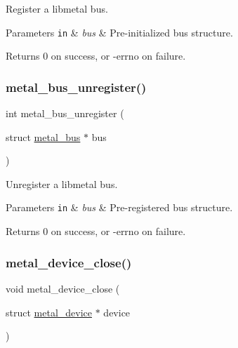Register a libmetal bus. 


\begin{DoxyParams}[1]{Parameters}
\mbox{\tt in}  & {\em bus} & Pre-\/initialized bus structure. \\
\hline
\end{DoxyParams}
\begin{DoxyReturn}{Returns}
0 on success, or -\/errno on failure. 
\end{DoxyReturn}
\mbox{\label{group__device_gafcc93056fa5993c770561e0e4865e623}} 
\subsubsection{\texorpdfstring{metal\+\_\+bus\+\_\+unregister()}{metal\_bus\_unregister()}}
{\footnotesize\ttfamily int metal\+\_\+bus\+\_\+unregister (\begin{DoxyParamCaption}\item[{struct \hyperlink{structmetal__bus}{metal\+\_\+bus} $\ast$}]{bus }\end{DoxyParamCaption})}



Unregister a libmetal bus. 


\begin{DoxyParams}[1]{Parameters}
\mbox{\tt in}  & {\em bus} & Pre-\/registered bus structure. \\
\hline
\end{DoxyParams}
\begin{DoxyReturn}{Returns}
0 on success, or -\/errno on failure. 
\end{DoxyReturn}
\mbox{\label{group__device_ga5baa99ff09fd6bd2b49c4739b28d4ed2}} 
\subsubsection{\texorpdfstring{metal\+\_\+device\+\_\+close()}{metal\_device\_close()}}
{\footnotesize\ttfamily void metal\+\_\+device\+\_\+close (\begin{DoxyParamCaption}\item[{struct \hyperlink{structmetal__device}{metal\+\_\+device} $\ast$}]{device }\end{DoxyParamCaption})}



